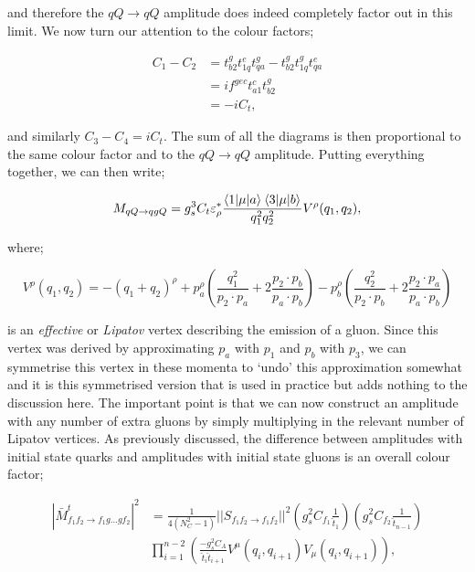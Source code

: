 and therefore the $qQ \to qQ$ amplitude does indeed completely factor out in this limit. We now turn our attention to the colour factors;

\begin{equation}
\begin{split}
C_1 - C_2 &= t^g_{b2} t^e_{1q} t^g_{qa} - t^g_{b2} t^g_{1q} t^e_{qa} \\
&=  if^{gec}t^c_{a1}t^g_{b2} \\
&= -i C_t,
\end{split}
\end{equation}

and similarly $C_3 - C_4 = iC_t$. The sum of all the diagrams is then proportional to the same colour factor and to the $qQ \to qQ$ amplitude. Putting everything together, we can then write;

\begin{equation}
M_{qQ \to qgQ} = g_s^3 C_t \varepsilon^*_\rho \frac{\mathinner{\langle1\vert\mu\vert a\rangle}_{} \mathinner{\langle3\vert\mu\vert b\rangle}_{}}{q_1^2 q_2^2} V^\rho (q_1, q_2),
\end{equation}

where;

\begin{equation}
V^\rho(q_1, q_2) = -(q_1 + q_2)^\rho + p_a^\rho \left( \frac{q_1^2}{p_2 \cdot p_a} + 2 \frac{p_2 \cdot p_b}{p_a \cdot p_b}\right) -  p_b^\rho \left( \frac{q_2^2}{p_2 \cdot p_b} + 2 \frac{p_2 \cdot p_a}{p_a \cdot p_b}\right)
\end{equation}

is an \emph{effective} or \emph{Lipatov} vertex describing the emission of a gluon. Since this vertex was derived by approximating $p_a$ with $p_1$ and $p_b$ with $p_3$, we can symmetrise this vertex in these momenta to `undo' this approximation somewhat and it is this symmetrised version that is used in practice but adds nothing to the discussion here. The important point is that we can now construct an amplitude with any number of extra gluons by simply multiplying in the relevant number of Lipatov vertices. As previously discussed, the difference between amplitudes with initial state quarks and amplitudes with initial state gluons is an overall colour factor;

\begin{equation}
\begin{split}
|\bar{M}^t_{f_1 f_2 \to f_1 g ... g f_2}|^2 &= \frac{1}{4 (N_C^2 - 1)} ||S_{f_1 f_2 \to f_1 f_2} ||^2 \left(g_s^2 C_{f_1} \frac{1}{\hat{t}_1} \right) \left(g_s^2 C_{f_2} \frac{1}{\hat{t}_{n-1}} \right) \\
& \prod_{i=1}^{n-2} \left(\frac{-g_s^2 C_{A}}{\hat{t}_i \hat{t}_{i+1}} V^\mu (q_i, q_{i+1}) V_\mu (q_i, q_{i+1})  \right),
 \end{split}
\end{equation}


